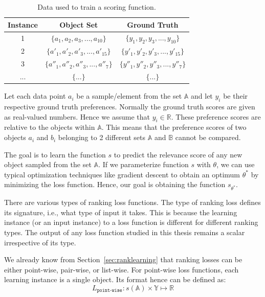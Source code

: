 \documentclass[12pt, twoside, ngerman]{report}
\begin{document}
\begin{table} [ht]
\centering
\begin{tabular}{ | c | c | c | }
  \toprule
  Instance & Object Set & Ground Truth \\ \midrule
  1 & $\{a_1, a_2, a_3, ... , a_{10}\}$  & $\{y_1, y_2, y_3, ... , y_{10}\}$  \\
  2 & $\{a'_1, a'_2, a'_3, ... , a'_{15}\}$ & $\{y'_1, y'_2, y'_3, ... , y'_{15}\}$  \\
  3 & $\{a''_1, a''_2, a''_3, ... , a''_{7}\}$ & $\{y''_1, y''_2, y''_3, ... , y''_{7}\}$  \\
  ... & $\{...\}$ & $\{...\}$ \\
  \bottomrule
\end{tabular}
\caption{Data used to train a scoring function.}
\label {tab:dataformat}
\end{table}

Let each data point $a_i$ be a sample/element from the set $\mathbb{A}$ and let $y_i$ be their respective ground truth preferences.
Normally the ground truth scores are given as real-valued numbers. Hence we assume that $y_i \in \mathbb{R}$.
These preference scores are relative to the objects within $\mathbb{A}$.
This means that the preference scores of two objects $a_i$ and $b_i$ belonging to 2 different sets $\mathbb{A}$ and $\mathbb{B}$ cannot be compared.

The goal is to learn the function $s$ to predict the relevance score of any new object sampled from the set $\mathbb{A}$.
If we parameterize function $s$ with $\theta$, we can use typical optimization techniques like gradient descent to obtain an optimum $\theta^*$ by minimizing the loss function. 
Hence, our goal is obtaining the function $s_{\theta^*}$.

There are various types of ranking loss functions. The type of ranking loss defines its signature, i.e., what type of input it takes.
This is because the learning instance (or an input instance) to a loss function is different for different ranking types.
The output of any loss function studied in this thesis remains a scalar irrespective of its type.

We already know from Section~\ref{sec:ranklearning} that ranking losses can be either point-wise, pair-wise, or list-wise.
For point-wise loss functions, each learning instance is a single object.
Its format hence can be defined as:
\begin{equation}
L_{\texttt{point-wise}} : s(\mathbb{A}) \times \mathbb{Y} \mapsto \mathbb{R}
\end{equation}
\end{document}
